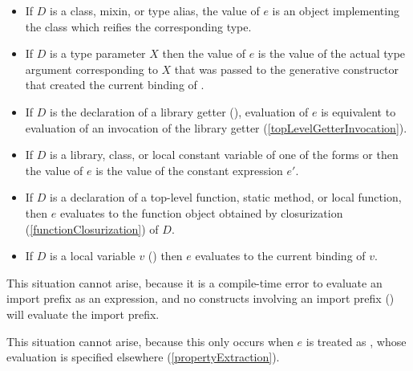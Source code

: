 \documentclass[makeidx]{article}
\begin{document}
{\begin{itemize}
\item
  If $D$ is a class, mixin, or type alias,
  the value of $e$ is an object implementing the class 
  which reifies the corresponding type.
\item
  If $D$ is a type parameter $X$ then the value of $e$ is
  the value of the actual type argument corresponding to $X$
  that was passed to the generative constructor that created
  the current binding of \THIS{}.
\item
  If $D$ is the declaration of a library getter
  (),
  evaluation of $e$ is equivalent to evaluation of an invocation of
  the library getter \id{}
  (\ref{topLevelGetterInvocation}).
\item
  If $D$ is a library, class, or local constant variable of one of the forms
   or 
  then the value of $e$ is the value of the constant expression $e'$.
\item
  If $D$ is a declaration of
  a top-level function, static method, or local function,
  then $e$ evaluates to the function object obtained by closurization
  (\ref{functionClosurization})
  of $D$.
\item
  If $D$ is a local variable $v$
  ()
  then $e$ evaluates to the current binding of $v$.
\end{itemize}

\EndCase

\LMHash{}%
This situation cannot arise,
because it is a compile-time error
to evaluate an import prefix as an expression,
and no constructs involving an import prefix
()
will evaluate the import prefix.
\EndCase

\LMHash{}%
This situation cannot arise,
because this only occurs when $e$ is treated as
,
whose evaluation is specified elsewhere
(\ref{propertyExtraction}).
\EndCase


}
\end{document}
